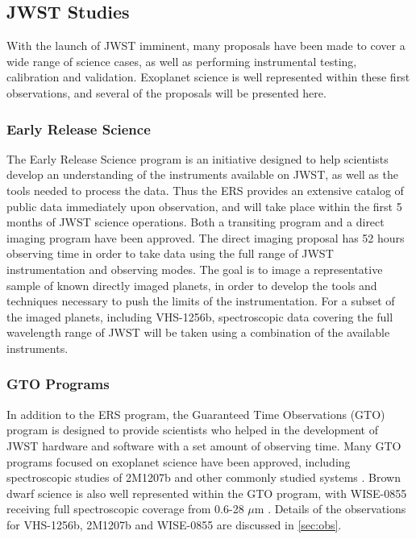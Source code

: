 \subsection{JWST Studies}
With the launch of JWST imminent, many proposals have been made to cover a wide range of science cases, as well as performing instrumental testing, calibration and validation.
Exoplanet science is well represented within these first observations, and several of the proposals will be presented here.
\subsubsection{Early Release Science}
The Early Release Science program is an initiative designed to help scientists develop an understanding of the instruments available on JWST, as well as the tools needed to process the data. 
Thus the ERS provides an extensive catalog of public data immediately upon observation, and will take place within the first 5 months of JWST science operations.
Both a transiting program \parencite{Bean2018} and a direct imaging program \parencite{Hinkley2019} have been approved.
The direct imaging proposal has 52 hours observing time in order to take data using the full range of JWST instrumentation and observing modes.
The goal is to image a representative sample of known directly imaged planets, in order to develop the tools and techniques necessary to push the limits of the instrumentation.
For a subset of the imaged planets, including VHS-1256b, spectroscopic data covering the full wavelength range of JWST will be taken using a combination of the available instruments.

\subsubsection{GTO Programs}
In addition to the ERS program, the Guaranteed Time Observations (GTO) program is designed to provide scientists who helped in the development of JWST hardware and software with a set amount of observing time. 
Many GTO programs focused on exoplanet science have been approved, including spectroscopic studies of 2M1207b and other commonly studied systems \parencite{Birkmann2019}.
Brown dwarf science is also well represented within the GTO program, with WISE-0855 receiving full spectroscopic coverage from 0.6-28 $\mu$m \parencite{Oliveira2019}.
Details of the observations for VHS-1256b, 2M1207b and WISE-0855 are discussed in \ref{sec:obs}.

